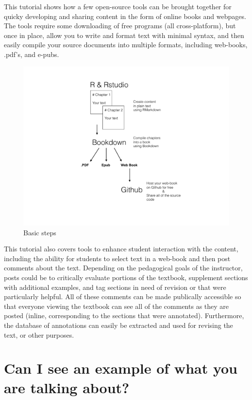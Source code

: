 \documentclass[
]{book}
\begin{document}
This tutorial shows how a few open-source tools can be brought together for quicky developing and sharing content in the form of online books and webpages. The tools require some downloading of free programs (all cross-platform), but once in place, allow you to write and format text with minimal syntax, and then easily compile your source documents into multiple formats, including web-books, .pdf's, and e-pubs.

\begin{figure}
\centering
\includegraphics{Figures/OERTutorial_Overview.pdf}
\caption{\label{fig:fig1}Basic steps}
\end{figure}

This tutorial also covers tools to enhance student interaction with the content, including the ability for students to select text in a web-book and then post comments about the text. Depending on the pedagogical goals of the instructor, posts could be to critically evaluate portions of the textbook, supplement sections with additional examples, and tag sections in need of revision or that were particularly helpful. All of these comments can be made publically accessible so that everyone viewing the textbook can see all of the comments as they are posted (inline, corresponding to the sections that were annotated). Furthermore, the database of annotations can easily be extracted and used for revising the text, or other purposes.

\hypertarget{can-i-see-an-example-of-what-you-are-talking-about}{%
\section{Can I see an example of what you are talking about?}\label{can-i-see-an-example-of-what-you-are-talking-about}}
\end{document}
